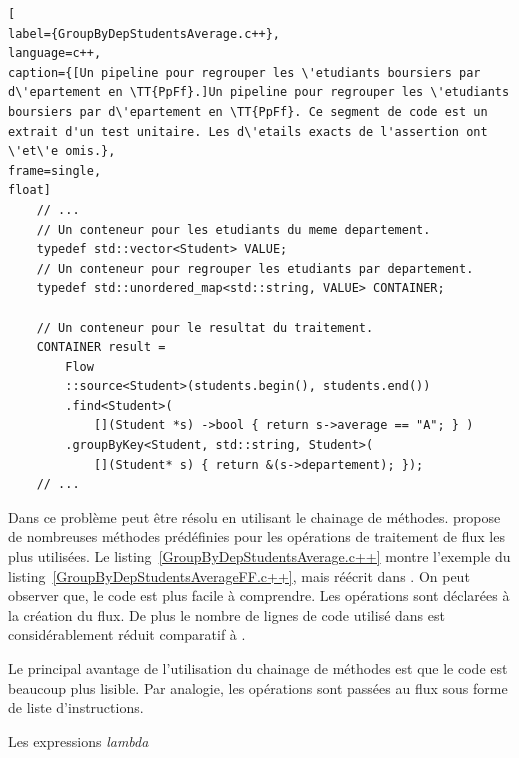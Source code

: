 \begin{lstlisting}[
label={GroupByDepStudentsAverage.c++},
language=c++,
caption={[Un pipeline pour regrouper les \'etudiants boursiers par d\'epartement en \TT{PpFf}.]Un pipeline pour regrouper les \'etudiants boursiers par d\'epartement en \TT{PpFf}. Ce segment de code est un extrait d'un test unitaire. Les d\'etails exacts de l'assertion ont \'et\'e omis.},
frame=single,
float]
    // ...
    // Un conteneur pour les etudiants du meme departement.
    typedef std::vector<Student> VALUE;
    // Un conteneur pour regrouper les etudiants par departement.
    typedef std::unordered_map<std::string, VALUE> CONTAINER; 

	// Un conteneur pour le resultat du traitement.
    CONTAINER result = 
        Flow
        ::source<Student>(students.begin(), students.end())
		.find<Student>( 
			[](Student *s) ->bool { return s->average == "A"; } )
        .groupByKey<Student, std::string, Student>(
        	[](Student* s) { return &(s->departement); });        
    // ...
\end{lstlisting}

Dans  ce probl\`eme peut \^etre r\'esolu en utilisant le chainage de m\'ethodes.  propose de nombreuses m\'ethodes pr\'ed\'efinies pour les op\'erations de traitement de flux les plus utilis\'ees. Le listing~\ref{GroupByDepStudentsAverage.c++} montre l'exemple du listing~\ref{GroupByDepStudentsAverageFF.c++}, mais r\'e\'ecrit dans . On peut observer que, le code est plus facile \`a comprendre. Les op\'erations sont d\'eclar\'ees \`a la cr\'eation du flux. De plus le nombre de lignes de code utilis\'e dans  est consid\'erablement r\'eduit comparatif \`a . 

Le principal avantage de l'utilisation du chainage de m\'ethodes est que le code est beaucoup plus lisible. Par analogie, les op\'erations sont pass\'ees au flux sous forme de liste d'instructions.


Les expressions \emph{lambda}

